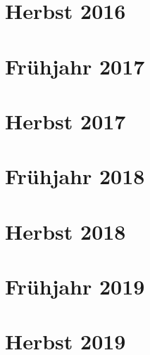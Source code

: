\documentclass{lehramt-informatik-examen-sammlung}
\begin{document}
\section{Herbst 2016}


\section{Frühjahr 2017}


\section{Herbst 2017}


\section{Frühjahr 2018}


\section{Herbst 2018}


\section{Frühjahr 2019}


\section{Herbst 2019}

\end{document}
